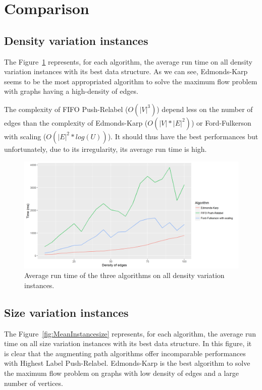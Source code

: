 \section{Comparison}
\subsection{Density variation instances}
The Figure~\ref{fig:MeanInstances} represents, for each algorithm, the average run time on all density variation instances with its best data structure. As we can see, Edmonds-Karp seems to be the most appropriated algorithm to solve the maximum flow problem with graphs having a high-density of edges.

The complexity of FIFO Push-Relabel ($O(|V|^3)$) depend less on the number of edges than the complexity of Edmonds-Karp ($O(|V|*|E|^2)$) or Ford-Fulkerson with scaling ($O(|E|^2* log(U))$). It should thus have the best performances but unfortunately, due to its irregularity, its average run time is high.

\begin{figure}[H]
\begin{center}
\includegraphics[scale=0.5]{images/meandensity.png}
\caption{Average run time of the three algorithms on all density variation instances.}
\label{fig:MeanInstances}
\end{center}
\end{figure}
\subsection{Size variation instances}
The Figure~\ref{fig:MeanInstancesize} represents, for each algorithm, the average run time on all size variation instances with its best data structure. In this figure, it is clear that the augmenting path algorithms offer incomparable performances with Highest Label Push-Relabel. Edmonds-Karp is the best algorithm to solve the maximum flow problem on graphs with low density of edges and a large number of vertices.

